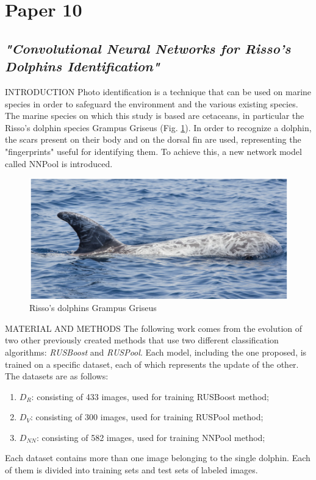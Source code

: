 \section{Paper 10}
\subsection{\emph{"Convolutional Neural Networks for Risso’s Dolphins Identification"}}

\begin{frame}{INTRODUCTION}
    Photo identification is a technique that can be used on marine species in 
    order to safeguard the environment and the various existing species. The 
    marine species on which this study is based are cetaceans, in particular the 
    Risso's dolphin species Grampus Griseus (Fig. \ref{fig:Risso}). In order to 
    recognize a dolphin, the scars present on their body and on the dorsal fin are 
    used, representing the "fingerprints" useful for identifying them. To 
    achieve this, a new network model called NNPool is introduced.
    \begin{figure}[h!]
        \centering
        \includegraphics[width = 0.5\linewidth]{images/paper10/Risso.png}
        \centering
        \caption{Risso’s dolphins Grampus Griseus}
        \label{fig:Risso}
    \end{figure}
\end{frame}

\begin{frame}{MATERIAL AND METHODS}
    The following work comes from the evolution of two other previously 
    created methods that use two different classification algorithms: 
    \emph{RUSBoost}  and \emph{RUSPool}. Each model, including the one proposed, is 
    trained on a specific dataset, each of which represents the update of the 
    other. The datasets are as follows:
    \begin{enumerate}
        \item $D_R$: consisting of 433 images, used for training RUSBoost method;
        \item $D_V$: consisting of 300 images, used for training RUSPool method;
        \item $D_{NN}$: consisting of 582 images, used for training NNPool method;
    \end{enumerate}
    Each dataset contains more than one image belonging to the single 
    dolphin. Each of them is divided into training sets and test sets of 
    labeled images.
\end{frame}

